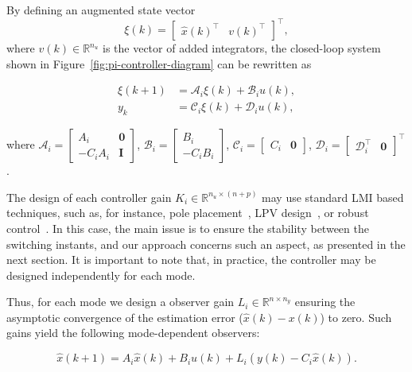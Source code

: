 By defining an augmented state vector
\[
	\xi(k)=\begin{bmatrix}{\hat{x}(k)}^\top &v{(k)}^\top\end{bmatrix}^\top,
\]
where \(v(k)\in\mathbb{R}^{n_u}\) is the vector of added integrators, the
closed-loop system shown in Figure~\ref{fig:pi-controller-diagram} can be
rewritten as

\begin{equation}
	\label{sistemaaum}
	\begin{split}
		\xi(k+1) &= \mathcal{A}_i\xi(k)+\mathcal{B}_{i}u(k), \\
		y_{k}    &= \mathcal{C}_i\xi(k)+\mathcal{D}_{i}u(k),
	\end{split}
\end{equation}

where \(\mathcal{A}_i=\begin{bmatrix}A_i & \textbf{0} \\-C_{i}A_i&\textbf{I}
\end{bmatrix} \), \(\mathcal{B}_i=\begin{bmatrix}B_i\\-C_{i}B_i\end{bmatrix}\),
\(\mathcal{C}_i=\begin{bmatrix} C_i & \textbf{0} \end{bmatrix}\),
\(\mathcal{D}_i=\begin{bmatrix}\mathcal{D}_i^\top&\textbf{0}\end{bmatrix}^\top\).

The design of each controller gain \(K_i\in\mathbb{R}^{n_u\times{}(n+p)}\) may use
standard LMI based techniques, such as, for instance, pole
placement~\parencite{yu:lmis}, LPV design~\parencite{briat:linear}, or robust
control~\parencite{boyd.ghaoui.ea:linear}. In this case, the main issue is to
ensure the stability between the switching instants, and our approach concerns
such an aspect, as presented in the next section. It is important to note that,
in practice, the controller may be designed independently for each mode.

Thus, for each mode we design a observer gain \(L_{i}\in\mathbb{R}^{n\times{}n_y}\)
ensuring the asymptotic convergence of the estimation error
(\(\hat{x}(k)-x(k)\)) to zero. Such gains yield the following mode-dependent
observers:

\begin{equation}
	\label{eq:observer}
	\hat{x}(k+1) = A_{i}\hat{x}(k) + B_{i}u(k) + L_{i}(y(k)-C_{i}\hat{x}(k)).
\end{equation}

